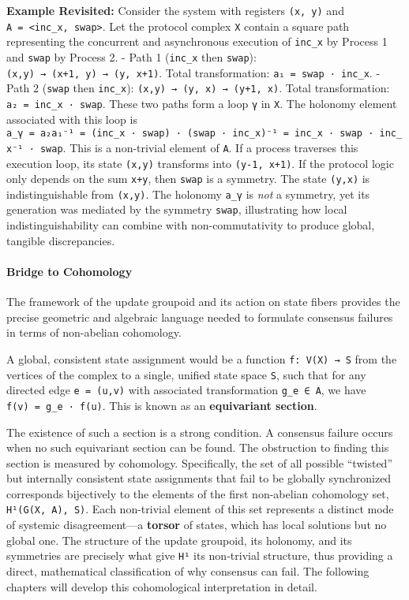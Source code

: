 \documentclass[
]{article}
\begin{document}
\textbf{Example Revisited:} Consider the system with registers
\texttt{(x,\ y)} and
\texttt{A\ =\ \textless{}inc\_x,\ swap\textgreater{}}. Let the protocol
complex \texttt{X} contain a square path representing the concurrent and
asynchronous execution of \texttt{inc\_x} by Process 1 and \texttt{swap}
by Process 2. - Path 1 (\texttt{inc\_x} then \texttt{swap}):
\texttt{(x,y)\ →\ (x+1,\ y)\ →\ (y,\ x+1)}. Total transformation:
\texttt{a₁\ =\ swap\ ·\ inc\_x}. - Path 2 (\texttt{swap} then
\texttt{inc\_x}): \texttt{(x,y)\ →\ (y,\ x)\ →\ (y+1,\ x)}. Total
transformation: \texttt{a₂\ =\ inc\_x\ ·\ swap}. These two paths form a
loop \texttt{γ} in \texttt{X}. The holonomy element associated with this
loop is
\texttt{a\_γ\ =\ a₂a₁⁻¹\ =\ (inc\_x\ ·\ swap)\ ·\ (swap\ ·\ inc\_x)⁻¹\ =\ inc\_x\ ·\ swap\ ·\ inc\_x⁻¹\ ·\ swap}.
This is a non-trivial element of \texttt{A}. If a process traverses this
execution loop, its state \texttt{(x,y)} transforms into
\texttt{(y-1,\ x+1)}. If the protocol logic only depends on the sum
\texttt{x+y}, then \texttt{swap} is a symmetry. The state \texttt{(y,x)}
is indistinguishable from \texttt{(x,y)}. The holonomy \texttt{a\_γ} is
\emph{not} a symmetry, yet its generation was mediated by the symmetry
\texttt{swap}, illustrating how local indistinguishability can combine
with non-commutativity to produce global, tangible discrepancies.

\paragraph{Bridge to Cohomology}\label{bridge-to-cohomology}

The framework of the update groupoid and its action on state fibers
provides the precise geometric and algebraic language needed to
formulate consensus failures in terms of non-abelian cohomology.

A global, consistent state assignment would be a function
\texttt{f:\ V(X)\ →\ S} from the vertices of the complex to a single,
unified state space \texttt{S}, such that for any directed edge
\texttt{e\ =\ (u,v)} with associated transformation \texttt{g\_e\ ∈\ A},
we have \texttt{f(v)\ =\ g\_e\ ·\ f(u)}. This is known as an
\textbf{equivariant section}.

The existence of such a section is a strong condition. A consensus
failure occurs when no such equivariant section can be found. The
obstruction to finding this section is measured by cohomology.
Specifically, the set of all possible ``twisted'' but internally
consistent state assignments that fail to be globally synchronized
corresponds bijectively to the elements of the first non-abelian
cohomology set, \texttt{H¹(G(X,\ A),\ S)}. Each non-trivial element of
this set represents a distinct mode of systemic disagreement---a
\textbf{torsor} of states, which has local solutions but no global one.
The structure of the update groupoid, its holonomy, and its symmetries
are precisely what give \texttt{H¹} its non-trivial structure, thus
providing a direct, mathematical classification of why consensus can
fail. The following chapters will develop this cohomological
interpretation in detail.
\end{document}
